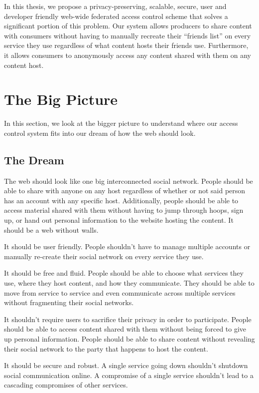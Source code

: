 \documentclass[pdftex,12pt,a4papaer,twoside,notitlepage]{report}
\begin{document}
In this thesis, we propose a privacy-preserving, scalable, secure, user and
developer friendly web-wide federated access control scheme that solves a
significant portion of this problem. Our system allows producers to share
content with consumers without having to manually recreate their ``friends
list'' on every service they use regardless of what content hosts their friends
use. Furthermore, it allows consumers to anonymously access any content shared
with them on any content host.

\section{The Big Picture}

In this section, we look at the bigger picture to understand where our access
control system fits into our dream of how the web should look.

\subsection{The Dream}

The web should look like one big interconnected social network. People should be
able to share with anyone on any host regardless of whether or not said person
has an account with any specific host. Additionally, people should be able to
access material shared with them without having to jump through hoops, sign up,
or hand out personal information to the website hosting the content. It should
be a web without walls.

It should be user friendly. People shouldn't have to manage multiple accounts or
manually re-create their social network on every service they use.

It should be free and fluid. People should be able to choose what services they
use, where they host content, and how they communicate. They should be able to
move from service to service and even communicate across multiple services
without fragmenting their social networks.

It shouldn't require users to sacrifice their privacy in order to participate.
People should be able to access content shared with them without being forced to
give up personal information. People should be able to share content without
revealing their social network to the party that happens to host the content.

It should be secure and robust. A single service going down shouldn't shutdown
social communication online. A compromise of a single service shouldn't lead to
a cascading compromises of other services.
\end{document}
